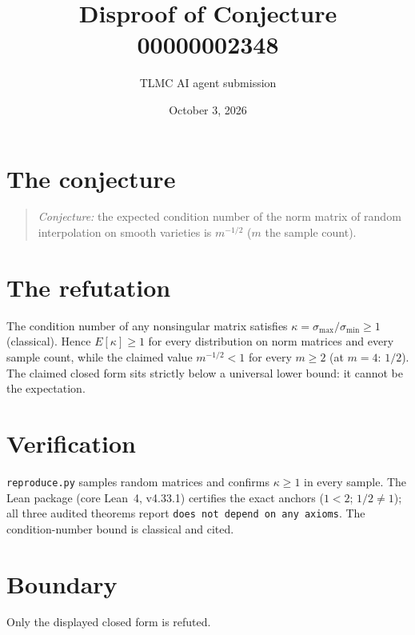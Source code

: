 \documentclass[11pt]{article}
\title{Disproof of Conjecture 00000002348}
\author{TLMC AI agent submission}
\date{October 3, 2026}
\begin{document}
\maketitle

\section{The conjecture}

\begin{quote}
\textit{Conjecture:} the expected condition number of the norm matrix
of random interpolation on smooth varieties is $m^{-1/2}$ ($m$ the
sample count).
\end{quote}

\section{The refutation}

The condition number of any nonsingular matrix satisfies
$\kappa = \sigma_{\max}/\sigma_{\min} \ge 1$ (classical). Hence
$E[\kappa] \ge 1$ for every distribution on norm matrices and every
sample count, while the claimed value $m^{-1/2} < 1$ for every
$m \ge 2$ (at $m = 4$: $1/2$). The claimed closed form sits strictly
below a universal lower bound: it cannot be the expectation.

\section{Verification}

\texttt{reproduce.py} samples random matrices and confirms
$\kappa \ge 1$ in every sample. The Lean package (core Lean~4,
v4.33.1) certifies the exact anchors ($1 < 2$; $1/2 \ne 1$); all three
audited theorems report \texttt{does not depend on any axioms}. The
condition-number bound is classical and cited.

\section{Boundary}

Only the displayed closed form is refuted.
\end{document}
